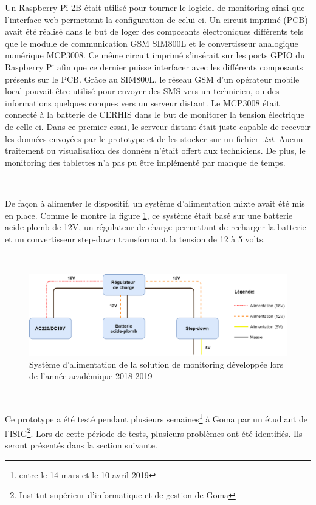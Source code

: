 \noindent
Un Raspberry Pi 2B était utilisé pour tourner le logiciel de monitoring ainsi que l'interface web permettant la configuration de celui-ci. Un circuit imprimé (PCB) avait été réalisé dans le but de loger des composants électroniques différents tels que le module de communication GSM SIM800L et le convertisseur analogique numérique MCP3008. Ce même circuit imprimé s'insérait sur les ports GPIO du Raspberry Pi afin que ce dernier puisse interfacer avec les différents composants présents sur le PCB. Grâce au SIM800L, le réseau GSM d'un opérateur mobile local pouvait être utilisé pour envoyer des SMS vers un technicien, ou des informations quelques conques vers un serveur distant. Le MCP3008 était connecté à la batterie de CERHIS dans le but de monitorer la tension électrique de celle-ci. Dans ce premier essai, le serveur distant était juste capable de recevoir les données envoyées par le prototype et de les stocker sur un fichier \textit{.txt}. Aucun traitement ou visualisation des données n'était offert aux techniciens. De plus, le monitoring des tablettes n'a pas pu être implémenté par manque de temps.

~

\noindent
De façon à alimenter le dispositif, un système d'alimentation mixte avait été mis en place. Comme le montre la figure \ref{fig:power_source}, ce système était basé sur une batterie acide-plomb de 12V, un régulateur de charge permettant de recharger la batterie et un convertisseur step-down transformant la tension de 12 à 5 volts.

~

\begin{figure}[ht!]
  \includegraphics[width=\textwidth]{img/el_prototype/power_source.png}
  \caption{Système d'alimentation de la solution de monitoring développée lors de l'année académique 2018-2019}
  \label{fig:power_source}
\end{figure}

~

\noindent
Ce prototype a été testé pendant plusieurs semaines\footnote{entre le 14 mars et le 10 avril 2019} à Goma par un étudiant de l'ISIG\footnote{Institut supérieur d'informatique et de gestion de Goma}. Lors de cette période de tests, plusieurs problèmes ont été identifiés. Ils seront présentés dans la section suivante.

